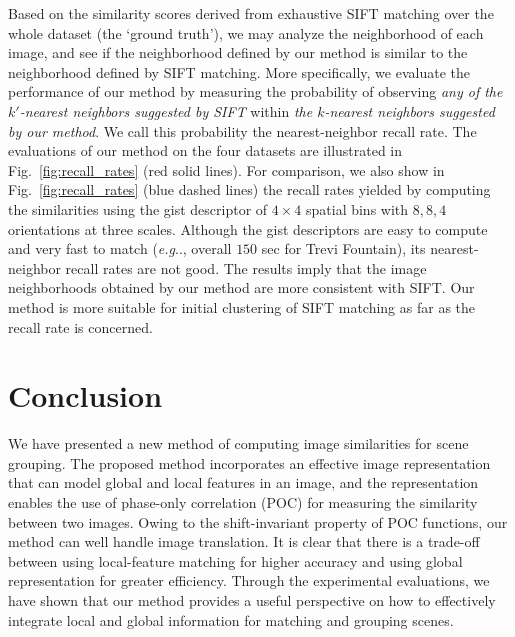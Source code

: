 \documentclass[conference]{IEEEtran}
\makeatletter
\DeclareRobustCommand\onedot{\futurelet\@let@token\@onedot}
\def\@onedot{\ifx\@let@token.\else.\null\fi\xspace}
\def\eg{\emph{e.g}\onedot} \def\Eg{\emph{E.g}\onedot}
\makeatother
\begin{document}
Based on the similarity scores derived from exhaustive SIFT matching over the whole dataset (the `ground truth'), we may analyze the neighborhood of each image, and see if the neighborhood defined by our method is similar to the neighborhood defined by SIFT matching. More specifically,
we evaluate the performance of our method by measuring the probability of observing {\em any of the $k'$-nearest neighbors suggested by SIFT} within {\em the $k$-nearest neighbors suggested by our method}. We call this probability the nearest-neighbor recall rate. 
The evaluations of our method on the four datasets are illustrated in Fig.~\ref{fig:recall_rates} (red solid lines). For comparison, we also show in Fig.~\ref{fig:recall_rates} (blue dashed lines) the recall rates yielded by computing the similarities using the gist descriptor of $4\times 4$ spatial bins with $8,8,4$ orientations at three scales. 
Although the gist descriptors are easy to compute and very fast to match (\eg, overall $150$ sec for {\sf Trevi Fountain}), its nearest-neighbor recall rates are not good. The results imply that the image neighborhoods obtained by our method are more consistent with SIFT. Our method is more suitable for initial clustering of SIFT matching as far as the recall rate is concerned.


\section{Conclusion}

We have presented a new method of computing image similarities for scene grouping. The proposed method incorporates an effective image representation that can model global and local features in an image, and the representation enables the use of phase-only correlation (POC) for measuring the similarity between two images. Owing to the shift-invariant property of POC functions, our method can well handle image translation. 
It is clear that there is a trade-off between using local-feature matching for higher accuracy and using global representation for greater efficiency. Through the experimental evaluations, we have shown that our method provides a useful perspective on how to effectively integrate local and global information for matching and grouping scenes. 
\end{document}
